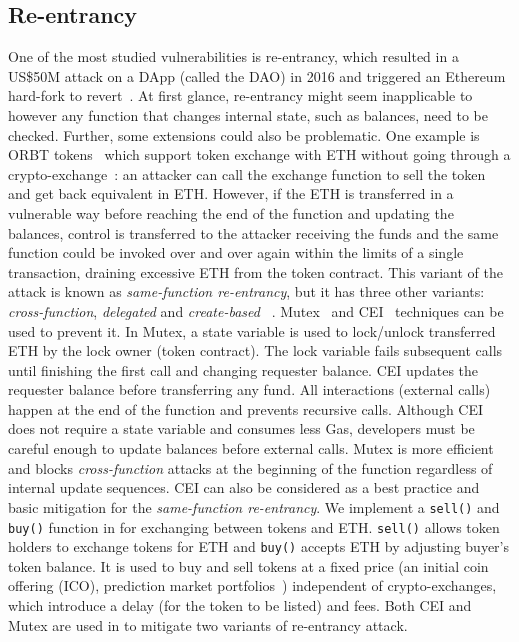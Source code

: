 \subsection{Re-entrancy}\label{subsec:ent}
One of the most studied vulnerabilities is re-entrancy, which resulted in a US\$50M attack on a DApp (called the DAO) in 2016 and triggered an Ethereum hard-fork to revert~\cite{DAO1}. At first glance, re-entrancy might seem inapplicable to \erc however any function that changes internal state, such as balances, need to be checked. Further, some \erc extensions could also be problematic. One example is ORBT tokens~\cite{ORBTToken} which support token exchange with ETH without going through a crypto-exchange~\cite{ORBT}: an attacker can call the exchange function to sell the token and get back equivalent in ETH. However, if the ETH is transferred in a vulnerable way before reaching the end of the function and updating the balances, control is transferred to the attacker receiving the funds and the same function could be invoked over and over again within the limits of a single transaction, draining excessive ETH from the token contract. This variant of the attack is known as \textit{same-function re-entrancy}, but it has three other variants: \textit{cross-function}, \textit{delegated} and \textit{create-based} ~\cite{SEREUM}. Mutex~\cite{WiKiMutex} and CEI~\cite{SolidtyDocSec} techniques can be used to prevent it. In Mutex, a state variable is used to lock/unlock transferred ETH by the lock owner (\ie token contract). The lock variable fails subsequent calls until finishing the first call and changing requester balance. CEI updates the requester balance before transferring any fund. All interactions (\ie external calls) happen at the end of the function and prevents recursive calls. Although CEI does not require a state variable and consumes less Gas, developers must be careful enough to update balances before external calls. Mutex is more efficient and blocks \textit{cross-function} attacks at the beginning of the function regardless of internal update sequences. CEI can also be considered as a best practice and basic mitigation for the \textit{same-function re-entrancy}. We implement a \texttt{sell()} and \texttt{buy()} function in \sys for exchanging between tokens and ETH. \texttt{sell()} allows token holders to exchange tokens for ETH and \texttt{buy()} accepts ETH by adjusting buyer's token balance. It is used to buy and sell tokens at a fixed price (\eg an initial coin offering (ICO), prediction market portfolios~\cite{CBN+14}) independent of crypto-exchanges, which introduce a delay (for the token to be listed) and fees. Both CEI and Mutex are used in \sys to mitigate two variants of re-entrancy attack.

